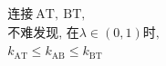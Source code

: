 \documentclass[preview]{standalone}
\begin{document}
\begin{align*}
& \text{连接}\ \mathrm{AT}, \  \mathrm{BT}, \\& \text{不难发现, 在}\lambda \in (0, 1) \text{时}, \\& k_{\mathrm{AT}} \leq k_{\mathrm{AB}} \leq k_{\mathrm{BT}}
\end{align*}
\end{document}
